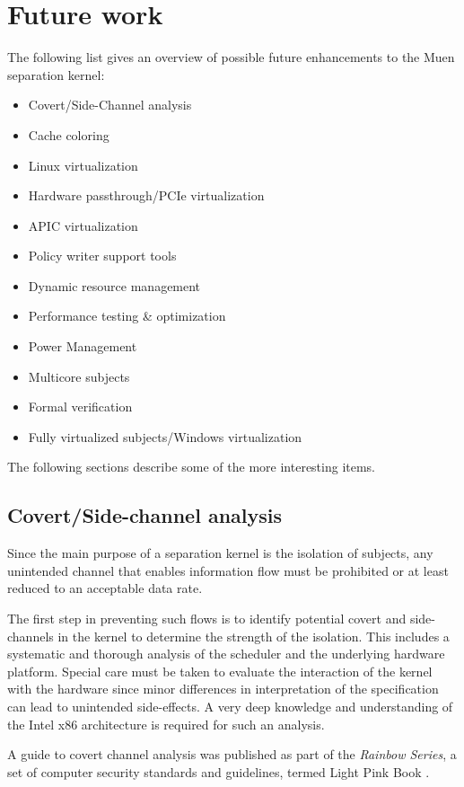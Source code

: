 \section{Future work}
The following list gives an overview of possible future enhancements to the
Muen separation kernel:

\begin{itemize}
	\item Covert/Side-Channel analysis
	\item Cache coloring
	\item Linux virtualization
	\item Hardware passthrough/PCIe virtualization
	\item APIC virtualization
	\item Policy writer support tools
	\item Dynamic resource management
	\item Performance testing \& optimization
	\item Power Management
	\item Multicore subjects
	\item Formal verification
	\item Fully virtualized subjects/Windows virtualization
\end{itemize}

The following sections describe some of the more interesting items.

\subsection{Covert/Side-channel analysis}
Since the main purpose of a separation kernel is the isolation of subjects, any
unintended channel that enables information flow must be prohibited or at least
reduced to an acceptable data rate.

The first step in preventing such flows is to identify potential covert and
side-channels in the kernel to determine the strength of the isolation. This
includes a systematic and thorough analysis of the scheduler and the underlying
hardware platform. Special care must be taken to evaluate the interaction of the
kernel with the hardware since minor differences in interpretation of the
specification can lead to unintended side-effects. A very deep knowledge and
understanding of the Intel x86 architecture is required for such an analysis.

A guide to covert channel analysis was published as part of the
\emph{Rainbow Series}, a set of computer security standards and guidelines,
termed Light Pink Book \cite{LightPinkBook}.

